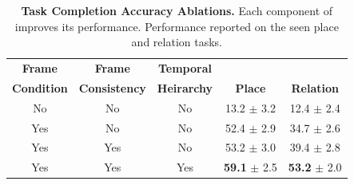 \begin{table}
\small\setlength{\tabcolsep}{4.0pt}
\centering
\begin{tabular}{ccccc}
      {\bf Frame} & {\bf Frame} & {\bf Temporal}  \\
      {\bf Condition} & {\bf Consistency} & {\bf Heirarchy} & {\bf Place} & {\bf Relation} \\
      \midrule
      No & No & No & 13.2 $\pm$ 3.2 & 12.4 $\pm$ 2.4 \\
      Yes & No & No & 52.4 $\pm$ 2.9 & 34.7 $\pm$ 2.6 \\
      Yes & Yes & No & 53.2 $\pm$ 3.0 & 39.4 $\pm$ 2.8\\
      Yes & Yes & Yes  & \textbf{59.1} $\pm$ 2.5 & \textbf{53.2} $\pm$ 2.0 \\
    \bottomrule
\end{tabular}
\vspace{5pt}
\caption{\small \textbf{Task Completion Accuracy Ablations.} Each component of \model improves its performance. Performance reported on the seen place and relation tasks.}
\label{tbl:ablations}
\vspace{-20pt}
\end{table}
